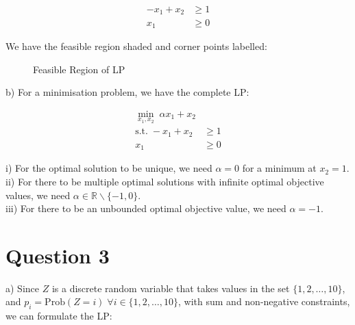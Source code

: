\documentclass[12pt]{article}
\begin{document}
\begin{align*}
    -x_{1} + x_{2} & \geq 1 \\ 
    x_{1} & \geq 0
\end{align*}

\noindent We have the feasible region shaded and corner points labelled: 

\begin{figure}[H]
    \centering
    \caption{Feasible Region of LP}
    \label{fig:2-feasiblelp2}
\end{figure} 

\noindent b) For a minimisation problem, we have the complete LP: 

\begin{align*}
    \min_{x_{1}, x_{2}} \; \alpha x_{1} + x_{2} \\ 
    \text{s.t.} \; -x_{1}+x_{2} & \geq 1 \\
    x_{1} & \geq 0
\end{align*}

\noindent i) For the optimal solution to be unique, we need $\alpha = 0$ for a minimum at $x_{2} = 1$. \\ 

\noindent ii) For there to be multiple optimal solutions with infinite optimal objective values, we need $\alpha \in \mathbb{R} \backslash \{-1,0\}$. \\ 

\noindent iii) For there to be an unbounded optimal objective value, we need $\alpha = -1$. 

\newpage 

\section*{Question 3}
a) Since $Z$ is a discrete random variable that takes values in the set $\{1, 2, \dots, 10\}$, and $p_i = \text{Prob}(Z = i) \; \forall i \in \{1, 2, \dots , 10\}$, with sum and non-negative constraints, we can formulate the LP: 
\end{document}
